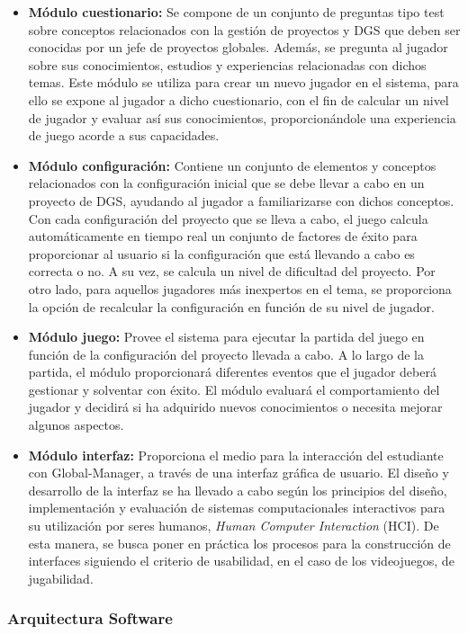 \begin{itemize}
	\item \textbf{Módulo cuestionario:} Se compone de un conjunto de preguntas tipo test sobre conceptos relacionados con la gestión de proyectos y DGS que deben ser conocidas por un jefe de proyectos globales. Además, se pregunta al jugador sobre sus conocimientos, estudios y experiencias relacionadas con dichos temas. Este módulo se utiliza para crear un nuevo jugador en el sistema, para ello se expone al jugador a dicho cuestionario, con el fin de calcular un nivel de jugador y evaluar así sus conocimientos, proporcionándole una experiencia de juego acorde a sus capacidades.
	\item \textbf{Módulo configuración:} Contiene un conjunto de elementos y conceptos relacionados con la configuración inicial que se debe llevar a cabo en un proyecto de DGS, ayudando al jugador a familiarizarse con dichos conceptos. Con cada configuración del proyecto que se lleva a cabo, el juego calcula automáticamente en tiempo real un conjunto de factores de éxito para proporcionar al usuario si la configuración que está llevando a cabo es correcta o no. A su vez, se calcula un nivel de dificultad del proyecto. Por otro lado, para aquellos jugadores más inexpertos en el tema, se proporciona la opción de recalcular la configuración en función de su nivel de jugador.
	\item \textbf{Módulo juego:} Provee el sistema para ejecutar la partida del juego en función de la configuración del proyecto llevada a cabo. A lo largo de la partida, el módulo proporcionará diferentes eventos que el jugador deberá gestionar y solventar con éxito. El módulo evaluará el comportamiento del jugador y decidirá si ha adquirido nuevos conocimientos o necesita mejorar algunos aspectos.
	\item \textbf{Módulo interfaz:} Proporciona el medio para la interacción del estudiante con Global-Manager, a través de una interfaz gráfica de usuario. El diseño y desarrollo de la interfaz se ha llevado a cabo según los principios del diseño, implementación y evaluación de sistemas computacionales interactivos para su utilización por seres humanos, \emph{Human Computer Interaction} (HCI). De esta manera, se busca poner en práctica los procesos para la construcción de interfaces siguiendo el criterio de usabilidad, en el caso de los videojuegos, de jugabilidad.
\end{itemize}

\subsubsection*{Arquitectura Software}

